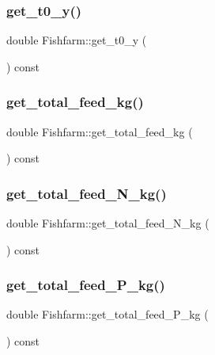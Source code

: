 \mbox{\label{class_fishfarm_adf2964e294891fbdef94cc1fd2b1346f}} 
\subsubsection{\texorpdfstring{get\_t0\_y()}{get\_t0\_y()}}
{\footnotesize\ttfamily double Fishfarm\+::get\+\_\+t0\+\_\+y (\begin{DoxyParamCaption}{ }\end{DoxyParamCaption}) const}

\mbox{\label{class_fishfarm_ac1e7001a0c92606f05999db104a631fc}} 
\subsubsection{\texorpdfstring{get\_total\_feed\_kg()}{get\_total\_feed\_kg()}}
{\footnotesize\ttfamily double Fishfarm\+::get\+\_\+total\+\_\+feed\+\_\+kg (\begin{DoxyParamCaption}{ }\end{DoxyParamCaption}) const}

\mbox{\label{class_fishfarm_af0bf5568a2ae439add36edb11c4e1164}} 
\subsubsection{\texorpdfstring{get\_total\_feed\_N\_kg()}{get\_total\_feed\_N\_kg()}}
{\footnotesize\ttfamily double Fishfarm\+::get\+\_\+total\+\_\+feed\+\_\+\+N\+\_\+kg (\begin{DoxyParamCaption}{ }\end{DoxyParamCaption}) const}

\mbox{\label{class_fishfarm_af75da4df1fecb171d1f0721d04526ce8}} 
\subsubsection{\texorpdfstring{get\_total\_feed\_P\_kg()}{get\_total\_feed\_P\_kg()}}
{\footnotesize\ttfamily double Fishfarm\+::get\+\_\+total\+\_\+feed\+\_\+\+P\+\_\+kg (\begin{DoxyParamCaption}{ }\end{DoxyParamCaption}) const}

